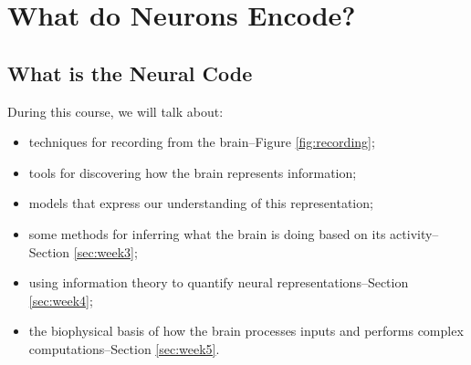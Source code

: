 \documentclass[]{article}
\begin{document}
\section{What do Neurons Encode?}\label{sec:week2}
\subsection{What is the Neural Code}
During this course, we will talk about:
\begin{itemize}
	\item techniques for recording from the brain--Figure \ref{fig:recording};
	\item  tools for discovering how the brain represents information;
	\item models that express our understanding of this representation;
	\item  some methods for inferring what the brain is doing based on its activity--Section \ref{sec:week3};
	\item  using information theory to quantify neural representations--Section \ref{sec:week4};
	\item the biophysical basis of how the brain processes inputs and performs complex computations--Section \ref{sec:week5}.
\end{itemize}
\end{document}
